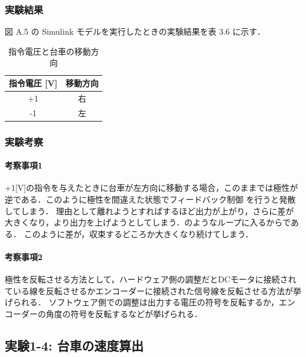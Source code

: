 \subsubsection{実験結果}
図 A.5 の Simulink モデルを実行したときの実験結果を表 3.6 に示す．

\begin{table}[h]
  \centering
  \caption{指令電圧と台車の移動方向}
  \label{tab:command_voltage_direction}
  \begin{tabular}{|c|c|}
    \hline
    指令電圧 [V] & 移動方向 \\
    \hline
    +1           & 右       \\
    \hline
    -1           & 左       \\
    \hline
  \end{tabular}
\end{table}

\subsubsection{実験考察}
\paragraph{考察事項1}
+1[V]の指令を与えたときに台車が左方向に移動する場合，このままでは極性が逆である．このように極性を間違えた状態でフィードバック制御
を行うと発散してしまう．
理由として離れようとすればするほど出力が上がり，さらに差が大きくなり，より出力を上げようとしてしまう．のようなループに入るからである．
このように差が，収束するどころか大きくなり続けてしまう．

\paragraph{考察事項2}
極性を反転させる方法として，ハードウェア側の調整だとDCモータに接続されている線を反転させるかエンコーダーに接続された信号線を反転させる方法が挙げられる．
ソフトウェア側での調整は出力する電圧の符号を反転するか，エンコーダーの角度の符号を反転するなどが挙げられる．


\subsection{実験1-4: 台車の速度算出}

